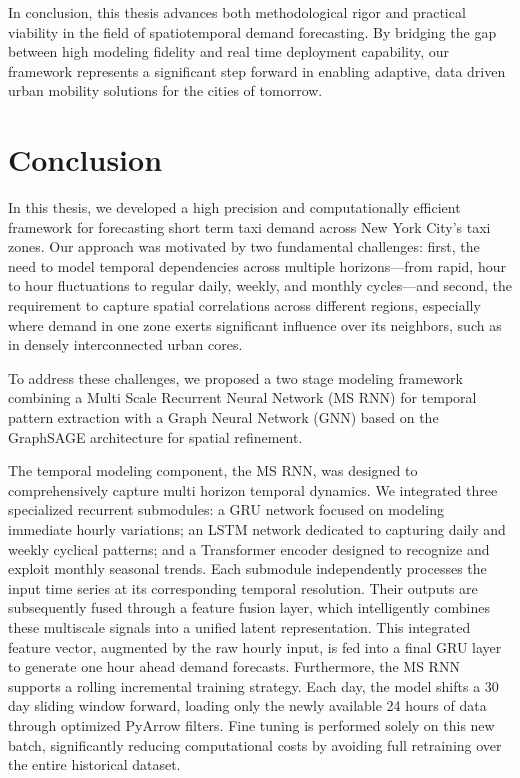 \documentclass{article}
\begin{document}
In conclusion, this thesis advances both methodological rigor and practical viability in the field of spatiotemporal demand forecasting. By bridging the gap between high modeling fidelity and real time deployment capability, our framework represents a significant step forward in enabling adaptive, data driven urban mobility solutions for the cities of tomorrow.


\section{Conclusion}
\label{sec:conclusion}
In this thesis, we developed a high precision and computationally efficient framework for forecasting short term taxi demand across New York City's taxi zones. Our approach was motivated by two fundamental challenges: first, the need to model temporal dependencies across multiple horizons—from rapid, hour to hour fluctuations to regular daily, weekly, and monthly cycles—and second, the requirement to capture spatial correlations across different regions, especially where demand in one zone exerts significant influence over its neighbors, such as in densely interconnected urban cores.

To address these challenges, we proposed a two stage modeling framework combining a Multi Scale Recurrent Neural Network (MS RNN) for temporal pattern extraction with a Graph Neural Network (GNN) based on the GraphSAGE architecture for spatial refinement.

The temporal modeling component, the MS RNN, was designed to comprehensively capture multi horizon temporal dynamics. We integrated three specialized recurrent submodules: a GRU network focused on modeling immediate hourly variations; an LSTM network dedicated to capturing daily and weekly cyclical patterns; and a Transformer encoder designed to recognize and exploit monthly seasonal trends. Each submodule independently processes the input time series at its corresponding temporal resolution. Their outputs are subsequently fused through a feature fusion layer, which intelligently combines these multiscale signals into a unified latent representation. This integrated feature vector, augmented by the raw hourly input, is fed into a final GRU layer to generate one hour ahead demand forecasts. Furthermore, the MS RNN supports a rolling incremental training strategy. Each day, the model shifts a 30 day sliding window forward, loading only the newly available 24 hours of data through optimized PyArrow filters. Fine tuning is performed solely on this new batch, significantly reducing computational costs by avoiding full retraining over the entire historical dataset.
\end{document}
